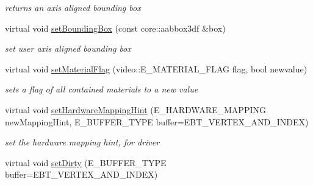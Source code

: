 \begin{DoxyCompactItemize}
\begin{DoxyCompactList}\small\item\em returns an axis aligned bounding box \end{DoxyCompactList}\item 
\hypertarget{classirr_1_1scene_1_1_c_skinned_mesh_a63e55fce117840eb49034c70681974ae}{virtual void \hyperlink{classirr_1_1scene_1_1_c_skinned_mesh_a63e55fce117840eb49034c70681974ae}{set\-Bounding\-Box} (const core\-::aabbox3df \&box)}\label{classirr_1_1scene_1_1_c_skinned_mesh_a63e55fce117840eb49034c70681974ae}

\begin{DoxyCompactList}\small\item\em set user axis aligned bounding box \end{DoxyCompactList}\item 
\hypertarget{classirr_1_1scene_1_1_c_skinned_mesh_a5cb76375c5ec10d87bece2f31d40de6b}{virtual void \hyperlink{classirr_1_1scene_1_1_c_skinned_mesh_a5cb76375c5ec10d87bece2f31d40de6b}{set\-Material\-Flag} (video\-::\-E\-\_\-\-M\-A\-T\-E\-R\-I\-A\-L\-\_\-\-F\-L\-A\-G flag, bool newvalue)}\label{classirr_1_1scene_1_1_c_skinned_mesh_a5cb76375c5ec10d87bece2f31d40de6b}

\begin{DoxyCompactList}\small\item\em sets a flag of all contained materials to a new value \end{DoxyCompactList}\item 
\hypertarget{classirr_1_1scene_1_1_c_skinned_mesh_a4b7bb8d1ff94e6b6011d25406e987839}{virtual void \hyperlink{classirr_1_1scene_1_1_c_skinned_mesh_a4b7bb8d1ff94e6b6011d25406e987839}{set\-Hardware\-Mapping\-Hint} (E\-\_\-\-H\-A\-R\-D\-W\-A\-R\-E\-\_\-\-M\-A\-P\-P\-I\-N\-G new\-Mapping\-Hint, E\-\_\-\-B\-U\-F\-F\-E\-R\-\_\-\-T\-Y\-P\-E buffer=E\-B\-T\-\_\-\-V\-E\-R\-T\-E\-X\-\_\-\-A\-N\-D\-\_\-\-I\-N\-D\-E\-X)}\label{classirr_1_1scene_1_1_c_skinned_mesh_a4b7bb8d1ff94e6b6011d25406e987839}

\begin{DoxyCompactList}\small\item\em set the hardware mapping hint, for driver \end{DoxyCompactList}\item 
\hypertarget{classirr_1_1scene_1_1_c_skinned_mesh_ab7d58140f563c01086307fda52a3a997}{virtual void \hyperlink{classirr_1_1scene_1_1_c_skinned_mesh_ab7d58140f563c01086307fda52a3a997}{set\-Dirty} (E\-\_\-\-B\-U\-F\-F\-E\-R\-\_\-\-T\-Y\-P\-E buffer=E\-B\-T\-\_\-\-V\-E\-R\-T\-E\-X\-\_\-\-A\-N\-D\-\_\-\-I\-N\-D\-E\-X)}\label{classirr_1_1scene_1_1_c_skinned_mesh_ab7d58140f563c01086307fda52a3a997}


\end{DoxyCompactItemize}
